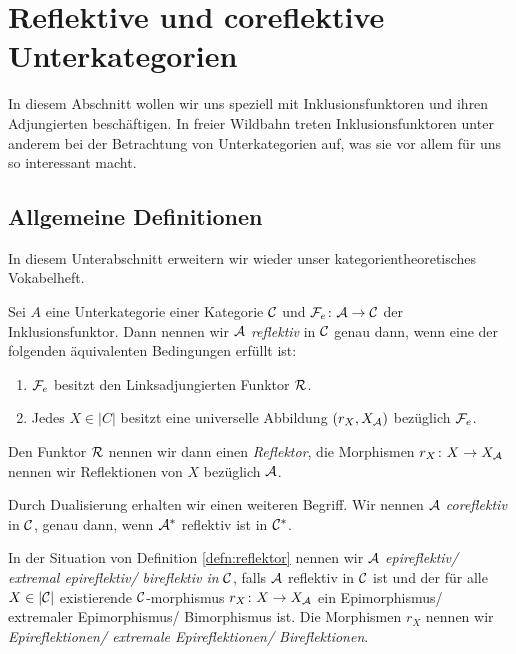 \section{Reflektive und coreflektive Unterkategorien}

In diesem Abschnitt wollen wir uns speziell mit Inklusionsfunktoren und ihren Adjungierten beschäftigen. 
In freier Wildbahn treten Inklusionsfunktoren unter anderem bei der Betrachtung von Unterkategorien auf, was sie vor allem für uns so interessant macht.

\subsection{Allgemeine Definitionen}

In diesem Unterabschnitt erweitern wir wieder unser kategorientheoretisches Vokabelheft.

\begin{defn}
  \label{defn:reflektor}
  Sei $A$ eine Unterkategorie einer Kategorie $\mathcal{C}$ und $\mathcal{F}_e \colon \mathcal{A} \to \mathcal{C}$ der Inklusionsfunktor.
  Dann nennen wir $\mathcal{A}$ \emph{reflektiv} in $\mathcal{C}$ genau dann, wenn eine der folgenden äquivalenten Bedingungen erfüllt ist:
  \begin{enumerate}[(1)]
    \item $\mathcal{F}_e$ besitzt den Linksadjungierten Funktor $\mathcal{R}$.
    \item Jedes $X \in |C|$ besitzt eine universelle Abbildung $(r_X, X_{\mathcal{A}})$ bezüglich $\mathcal{F}_e$.
  \end{enumerate}
  Den Funktor $\mathcal{R}$ nennen wir dann einen \emph{Reflektor}, die Morphismen $r_X \colon X \to X_{\mathcal{A}}$ nennen wir Reflektionen von $X$ bezüglich $\mathcal{A}$.

  Durch Dualisierung erhalten wir einen weiteren Begriff.
  Wir nennen $\mathcal{A}$ \emph{coreflektiv} in $\mathcal{C}$, genau dann, wenn $\mathcal{A}^*$ reflektiv ist in $\mathcal{C}^*$. 
\end{defn}

\begin{defn}
  In der Situation von Definition \ref{defn:reflektor} nennen wir $\mathcal{A}$ \emph{epireflektiv/ extremal epireflektiv/ bireflektiv in} $\mathcal{C}$, falls $\mathcal{A}$ reflektiv in $\mathcal{C}$ ist und der für alle $X \in |\mathcal{C}|$ existierende $\mathcal{C}$-morphismus $r_X \colon X \to X_{\mathcal{A}}$ ein Epimorphismus/ extremaler Epimorphismus/ Bimorphismus ist.
  Die Morphismen $r_X$ nennen wir \emph{Epireflektionen/ extremale Epireflektionen/ Bireflektionen}.
\end{defn}

